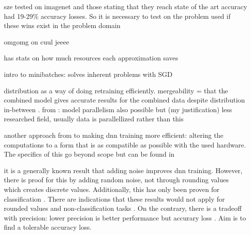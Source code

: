 sze tested on imagenet and those stating that they reach state of the art accuracy had 19-29\% accuracy losses. So it is necessary to test on the problem used if these wins exist in the problem domain 

omgomg \cite{courbariaux_binarized_2016} on cuul jeeee

\cite{sze_efficient_2017} has stats on how much resources each approximation saves


intro to minibatches: solves inherent problems with SGD

distribution as a way of doing retraining efficiently. mergeability =  that the combined model gives accurate results for the combined data despite distribution in-between \cite{bifetMachineLearningData2017}. from \cite{ben-nunDemystifyingParallelDistributed2019}: model parallelism also possible but (my justification) less researched field, usually data is parallellized rather than this

another approach from \cite{ben-nunDemystifyingParallelDistributed2019} to making dnn training more efficient: altering the computations to a form that is as compatible as possible with the used hardware. The specifics of this go beyond scope but can be found in \cite{ben-nunDemystifyingParallelDistributed2019}



it is a generally known result that adding noise improves dnn training. However, there is proof for this by adding random noise, not through rounding values which creates discrete values. Additionally, this has only been proven for classification \cite{murray_enhanced_1994}. There are indications that these results would not apply for rounded values and non-classification tasks \cite{an_effects_1996}. On the contrary, there is a tradeoff with precision: lower precision is better performance but accurary loss \cite{de_sa_high-accuracy_2018} \cite{courbariaux_training_2015}. Aim is to find a tolerable accuracy loss.



